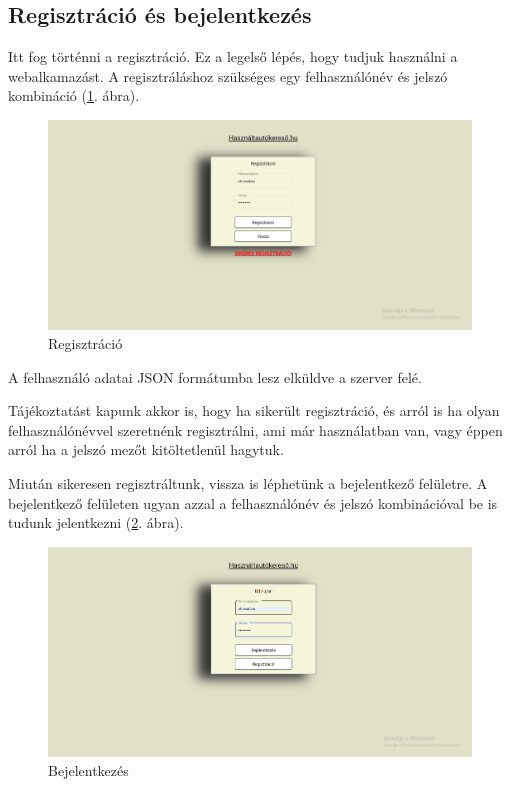 
\subsection{Regisztráció és bejelentkezés}
Itt fog történni a regisztráció. Ez a legelső lépés, hogy tudjuk használni a webalkamazást.
A regisztráláshoz szükséges egy felhasználónév és jelszó kombináció (\ref{fig:regisztracio}. ábra).

\begin{figure}[h]
\centering
\includegraphics[scale=0.37]{images/regisztracio.png}
\caption{Regisztráció}
\label{fig:regisztracio}
\end{figure}

A felhasználó adatai JSON formátumba lesz elküldve a szerver felé.

Tájékoztatást kapunk akkor is, hogy ha sikerült regisztráció, és arról is ha olyan felhasználónévvel szeretnénk regisztrálni, ami már használatban van, vagy éppen arról ha a jelszó mezőt kitöltetlenül hagytuk.

Miután sikeresen regisztráltunk, vissza is léphetünk a bejelentkező felületre.
A bejelentkező felületen ugyan azzal a felhasználónév és jelszó kombinációval be is tudunk jelentkezni (\ref{fig:bejelentkezes}. ábra).

\begin{figure}[h]
\centering
\includegraphics[scale=0.37]{images/bejelentkezes.png}
\caption{Bejelentkezés}
\label{fig:bejelentkezes}
\end{figure}


